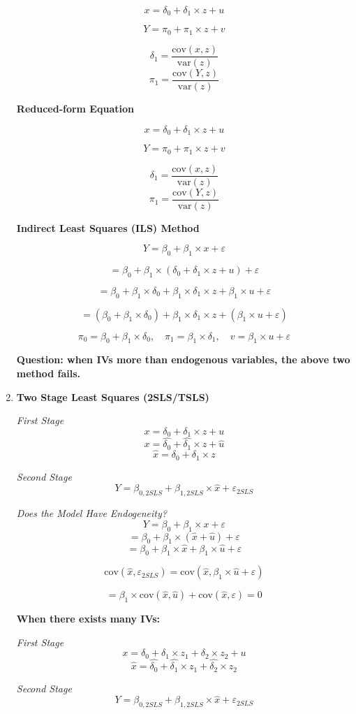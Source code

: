 \documentclass[12pt, oneside]{article}
\begin{document}
\begin{enumerate}
\[
x = \delta_0 + \delta_1 \times z + u
\]

\[
Y = \pi_0 + \pi_1 \times z + v
\]

\[
\delta_1 = \frac{\text{cov}(x, z)}{\text{var}(z)}
\]
\[
\pi_1 = \frac{\text{cov}(Y, z)}{\text{var}(z)}
\]

\textbf*{Reduced-form Equation}

\[
x = \delta_0 + \delta_1 \times z + u
\]

\[
Y = \pi_0 + \pi_1 \times z + v
\]

\[
\delta_1 = \frac{\text{cov}(x, z)}{\text{var}(z)}
\]
\[
\pi_1 = \frac{\text{cov}(Y, z)}{\text{var}(z)}
\]

\textbf*{Indirect Least Squares (ILS) Method}

\[
Y = \beta_0 + \beta_1 \times x + \varepsilon
\]

\[
= \beta_0 + \beta_1 \times (\delta_0 + \delta_1 \times z + u) + \varepsilon
\]

\[
= \beta_0 + \beta_1 \times \delta_0 + \beta_1 \times \delta_1 \times z + \beta_1 \times u + \varepsilon
\]

\[
= (\beta_0 + \beta_1 \times \delta_0) + \beta_1 \times \delta_1 \times z + (\beta_1 \times u + \varepsilon)
\]

\[
\pi_0 = \beta_0 + \beta_1 \times \delta_0, \quad
\pi_1 = \beta_1 \times \delta_1, \quad
v = \beta_1 \times u + \varepsilon
\]

\textbf{Question: when IVs more than endogenous variables, the above two method fails.}

\item \textbf{Two Stage Least Squares (2SLS/TSLS)}

\textit*{First Stage}
\[
x = \delta_0 + \delta_1 \times z + u
\]
\[
x = \hat{\delta_0} + \hat{\delta_1} \times z + \hat{u}
\]
\[
\hat{x} = \delta_0 + \delta_1 \times z
\]

\textit*{Second Stage}
\[
Y = \beta_{0,2SLS} + \beta_{1,2SLS} \times \hat{x} + \varepsilon_{2SLS}
\]

\textit*{Does the Model Have Endogeneity?}
\[
Y = \beta_0 + \beta_1 \times x + \varepsilon
\]
\[
= \beta_0 + \beta_1 \times (\hat{x} + \hat{u}) + \varepsilon
\]
\[
= \beta_0 + \beta_1 \times \hat{x} + \beta_1 \times \hat{u} + \varepsilon
\]

\[
\text{cov}(\hat{x}, \varepsilon_{2SLS}) = \text{cov}(\hat{x}, \beta_1 \times \hat{u} + \varepsilon)
\]

\[
= \beta_1 \times \text{cov}(\hat{x}, \hat{u}) + \text{cov}(\hat{x}, \varepsilon) = 0
\]

\textbf{When there exists many IVs:}

\textit*{First Stage}
\[
x = \delta_0 + \delta_1 \times z_1 + \delta_2 \times z_2 + u
\]
\[
\hat{x} = \hat{\delta_0} + \hat{\delta_1} \times z_1 + \hat{\delta_2} \times z_2
\]

\textit*{Second Stage}
\[
Y = \beta_{0,2SLS} + \beta_{1,2SLS} \times \hat{x} + \varepsilon_{2SLS}
\]
\end{enumerate}
\end{document}
